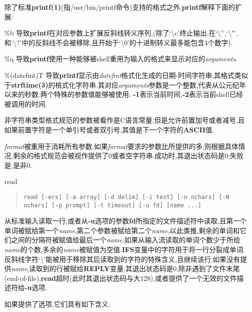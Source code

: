 \documentclass[draft,openany]{book}
\begin{document}
\begin{CJK}{UTF8}{gbsn}
\begin{basedescript}{\desclabelstyle{\nextlinelabel}\desclabelwidth{2.5em}}
        除了标准\textbf{printf(1)}(指/usr/bin/printf命令)支持的格式之外,\textbf{printf}解释下面的扩展:
        \begin{basedescript}{\desclabelstyle{\nextlinelabel}\desclabelwidth{2.5em}}
        \item[\%b] 导致\textbf{printf}在对应参数上扩展反斜线转义序列,(除了`\textbackslash{}c'终止输出,在`\textbackslash'',`\textbackslash"',和`\textbackslash{}?'中的反斜线不会被移除,且开始于`\textbackslash{}0'的十进制转义最多能包含4个数字).
        \item[\%q] 导致\textbf{printf}使用一种能够被shell重用为输入的格式来显示对应的\emph{arguments}.
        \item[\%(datefmt)T] 导致\textbf{printf}显示由\emph{datefmt}格式化生成的日期-时间字符串,其格式类似于\textbf{strftime(3)}的格式化字符串.其对应\emph{arguments}参数是一个整数,代表从公元纪年以来的秒数.两个特殊的参数值能够被使用: \textbf{-1}表示当前时间,\textbf{-2}表示当前shell已经被调用的时间.\par
        \end{basedescript}
        非字符串类型格式规范的参数被看作是C语言常量,但是允许前置加号或者减号,且如果前置字符是一个单引号或者双引号,其值是下一个字符的\textbf{ASCII}值.\par
        \emph{format}被重用于消耗所有参数.如果\emph{format}要求的参数比所提供的多,则根据具体情况,剩余的格式规范会被视作提供了0或者空字符串.成功时,其退出状态码是0;失败是,是非0.
    \item[read]
        \begin{quote}
            \verb+read [-ers] [-a array] [-d delim] [-i text] [-n nchars] [-N nchars] [-p prompt] [-t timeout] [-u fd] [name ...]+
        \end{quote}
        从标准输入读取一行,或者从\textbf{-u}选项的参数\textbf{fd}所指定的文件描述符中读取,且第一个单词被赋给第一个\emph{name},第二个参数被赋给第二个\emph{name},以此类推,剩余的单词和它们之间的分隔符被赋值给最后一个\emph{name}.如果从输入流读取的单词个数少于所给\emph{name}的个数,多余的\emph{name}被赋值为空值.\textbf{IFS}变量中的字符用于将一行分裂成单词.反斜线字符`\textbackslash'能被用于移除其后读取到的字符的特殊含义,且继续该行.如果没有提供\emph{name},读取到的行被赋给\textbf{REPLY}变量.其退出状态码是0,除非遇到了文件末尾(end-of-file),\textbf{read}超时(此时其退出状态码与大128),或者提供了一个无效的文件描述符给\textbf{-u}选项.\par
        如果提供了选项,它们具有如下含义:
        \begin{basedescript}{\desclabelstyle{\nextlinelabel}\desclabelwidth{2.5em}}

\end{basedescript}
\end{basedescript}
\end{CJK}
\end{document}
